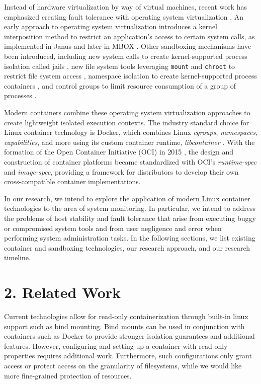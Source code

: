 \documentclass{proc}
\begin{document}
Instead of hardware virtualization by way of virtual machines, recent work has emphasized creating fault tolerance with operating system virtualization \cite{soltesz2007container}. An early approach to operating system virtualization introduces a kernel interposition method to restrict an application's access to certain system calls, as implemented in Janus \cite{goldberg1996janus} and later in MBOX \cite{kim2013mbox}. Other sandboxing mechanisms have been introduced, including new system calls to create kernel-supported process isolation called jails \cite{kamp2000jails}, new file system tools leveraging \texttt{mount} and \texttt{chroot} to restrict file system access \cite{prevelakis2001fmac}, namespace isolation to create kernel-supported process containers \cite{biederman2006namespaces, menage2007containers}, and control groups to limit resource consumption of a group of processes \cite{menagecgroups}.

Modern containers combine these operating system virtualization approaches to create lightweight isolated execution contexts. The industry standard choice for Linux container technology is Docker, which combines Linux \textit{cgroups}, \textit{namespaces}, \textit{capabilities}, and more using its custom container runtime, \textit{libcontainer} \cite{hykes2014libcontainer}. With the formation of the Open Container Initiative (OCI) in 2015 \cite{opencontainerinitiative}, the design and construction of container platforms became standardized with OCI's \textit{runtime-spec} and \textit{image-spec}, providing a framework for distributors to develop their own cross-compatible container implementations.

In our research, we intend to explore the application of modern Linux container technologies to the area of system monitoring. In particular, we intend to address the problems of host stability and fault tolerance that arise from executing buggy or compromised system tools and from user negligence and error when performing system administration tasks. In the following sections, we list existing container and sandboxing technologies, our research approach, and our research timeline.

\section*{2. Related Work}
Current technologies allow for read-only containerization through built-in linux support such as bind mounting. Bind mounts can be used in conjunction with containers such as Docker to provide stronger isolation guarantees and additional features\cite{dockerdoc}. However, configuring and setting up a container with read-only properties requires additional work. Furthermore, such configurations only grant access or protect access on the granularity of filesystems, while we would like more fine-grained protection of resources.
\end{document}
